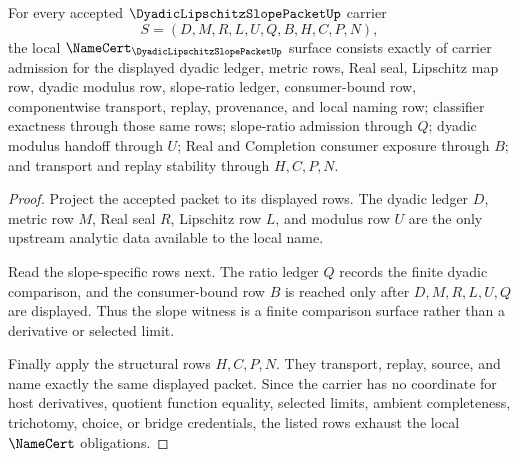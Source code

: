 \begin{theorem}
\label{thm:dyadic-lipschitz-slope-packet-namecert-obligations}
For every accepted $\DyadicLipschitzSlopePacketUp$ carrier
$$
S=(D,M,R,L,U,Q,B,H,C,P,N),
$$
the local $\NameCert_{\DyadicLipschitzSlopePacketUp}$ surface consists exactly of carrier admission for the displayed dyadic ledger, metric rows, Real seal, Lipschitz map row, dyadic modulus row, slope-ratio ledger, consumer-bound row, componentwise transport, replay, provenance, and local naming row; classifier exactness through those same rows; slope-ratio admission through $Q$; dyadic modulus handoff through $U$; Real and Completion consumer exposure through $B$; and transport and replay stability through $H,C,P,N$.
\end{theorem}
\begin{proof}
Project the accepted packet to its displayed rows. The dyadic ledger $D$, metric row $M$, Real seal $R$, Lipschitz row $L$, and modulus row $U$ are the only upstream analytic data available to the local name.

Read the slope-specific rows next. The ratio ledger $Q$ records the finite dyadic comparison, and the consumer-bound row $B$ is reached only after $D,M,R,L,U,Q$ are displayed. Thus the slope witness is a finite comparison surface rather than a derivative or selected limit.

Finally apply the structural rows $H,C,P,N$. They transport, replay, source, and name exactly the same displayed packet. Since the carrier has no coordinate for host derivatives, quotient function equality, selected limits, ambient completeness, trichotomy, choice, or bridge credentials, the listed rows exhaust the local $\NameCert$ obligations.
\end{proof}


\begin{closurestatus}{\DyadicLipschitzSlopePacketUp}
  \theoryclosure{\seedClosure}
  \formalstatus{\unformalizedV}
\end{closurestatus}
